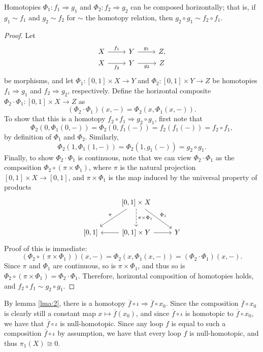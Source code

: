 \documentclass[11pt, letterpaper]{article}
\begin{document}
\begin{lemma}\label{lma:2}
	Homotopies $\Phi_1 : f_1 \Rightarrow g_1$ and $\Phi _2 : f_2 \Rightarrow g_2$ can be composed horizontally; that is, if $g_1 \sim f_1$ and $g_2\sim f_2$ for $\sim$ the homotopy relation, then $g_2\circ g_1\sim f_2\circ f_1$.
\end{lemma}
\begin{proof}
	Let
	\[\begin{tikzcd}[row sep = 0em, column sep = 2.5em]
	X\ar[" f_1 ", r]  & Y\ar[" g_1 ", r]  & Z, \\
	X\ar[" f_2 "', r]  & Y\ar[" g_2 "', r]  & Z
	\end{tikzcd}\]
	be morphisms, and let $\Phi _1 : [0,1]\times X \to Y$ and $\Phi _2 : [0,1]\times Y \to Z$ be homotopies $f_1 \Rightarrow g_1$ and $f_2 \Rightarrow g_2$, respectively. Define the horizontal composite $\Phi _2 \cdot \Phi _1 : [0,1]\times X \to Z$ as
	\[
		(\Phi _2 \cdot \Phi _1)(x,-)=\Phi _2(x,\Phi _1(x,-))
	.\]
	To show that this is a homotopy $f_2\circ f_1 \Rightarrow g_2\circ g_1$, first note that
	\[
		\Phi _2(0,\Phi _1(0,-))=\Phi _2(0,f_1(-))=f_2(f_1(-))=f_2\circ f_1,	
	\]
	by definition of $\Phi _1$ and $\Phi _2$. Similarly,
	\[
		\Phi _2(1,\Phi _1(1,-))=\Phi _2(1,g_1(-))=g_2\circ g_1
	.\]
	Finally, to show $\Phi _2\cdot \Phi _1$ is continuous, note that we can view $\Phi _2\cdot \Phi _1$ as the composition $\Phi _2 \circ (\pi \times \Phi _1)$, where $\pi $ is the natural projection $\left[ 0,1 \right] \times X\to [0,1]$, and $\pi \times \Phi _1$ is the map induced by the universal property of products
	\[\begin{tikzcd}[row sep = 2.5em, column sep = 2.5em]
	 & \left[ 0,1 \right] \times X \ar[" \pi  "', dl] \ar[" \Phi _1 ", dr] \ar[dashed, " \pi \times \Phi _1 ", d] &  \\
	\left[ 0,1 \right]  & \left[ 0,1 \right] \times Y\ar[l] \ar[r]  & Y
	\end{tikzcd}\]
	Proof of this is immediate:
	\[
		(\Phi _2\circ (\pi \times \Phi _1))(x,-)=\Phi _2(x,\Phi _1(x,-))=\left( \Phi _2\cdot \Phi _1 \right) (x,-)
	.\]
	Since $\pi $ and $\Phi _1$ are continuous, so is $\pi \times \Phi _1$, and thus so is $\Phi _2\circ (\pi \times \Phi _1)=\Phi _2\cdot \Phi _1$. Therefore, horizontal composition of homotopies holds, and $f_2\circ f_1\sim g_2\circ g_1$.
\end{proof}

By lemma \ref{lma:2}, there is a homotopy $\overline{f} \circ \iota \Rightarrow \overline{f} \circ x_0$. Since the composition $\overline{f} \circ x_0$ is clearly still a constant map $x\mapsto \overline{f} (x_0)$, and since $\overline{f} \circ \iota $ is homotopic to $\overline{f} \circ x_0$, we have that $\overline{f} \circ \iota $ is null-homotopic. Since any loop $f$ is equal to such a composition $\overline{f} \circ \iota $ by assumption, we have that every loop $f$ is null-homotopic, and thus $\pi _1(X)\cong 0$.
\end{document}
